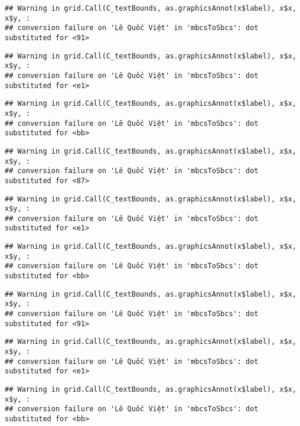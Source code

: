 \documentclass[
]{article}
\begin{document}
\begin{verbatim}
## Warning in grid.Call(C_textBounds, as.graphicsAnnot(x$label), x$x, x$y, :
## conversion failure on 'Lê Quốc Việt' in 'mbcsToSbcs': dot substituted for <91>
\end{verbatim}

\begin{verbatim}
## Warning in grid.Call(C_textBounds, as.graphicsAnnot(x$label), x$x, x$y, :
## conversion failure on 'Lê Quốc Việt' in 'mbcsToSbcs': dot substituted for <e1>
\end{verbatim}

\begin{verbatim}
## Warning in grid.Call(C_textBounds, as.graphicsAnnot(x$label), x$x, x$y, :
## conversion failure on 'Lê Quốc Việt' in 'mbcsToSbcs': dot substituted for <bb>
\end{verbatim}

\begin{verbatim}
## Warning in grid.Call(C_textBounds, as.graphicsAnnot(x$label), x$x, x$y, :
## conversion failure on 'Lê Quốc Việt' in 'mbcsToSbcs': dot substituted for <87>
\end{verbatim}

\begin{verbatim}
## Warning in grid.Call(C_textBounds, as.graphicsAnnot(x$label), x$x, x$y, :
## conversion failure on 'Lê Quốc Việt' in 'mbcsToSbcs': dot substituted for <e1>
\end{verbatim}

\begin{verbatim}
## Warning in grid.Call(C_textBounds, as.graphicsAnnot(x$label), x$x, x$y, :
## conversion failure on 'Lê Quốc Việt' in 'mbcsToSbcs': dot substituted for <bb>
\end{verbatim}

\begin{verbatim}
## Warning in grid.Call(C_textBounds, as.graphicsAnnot(x$label), x$x, x$y, :
## conversion failure on 'Lê Quốc Việt' in 'mbcsToSbcs': dot substituted for <91>
\end{verbatim}

\begin{verbatim}
## Warning in grid.Call(C_textBounds, as.graphicsAnnot(x$label), x$x, x$y, :
## conversion failure on 'Lê Quốc Việt' in 'mbcsToSbcs': dot substituted for <e1>
\end{verbatim}

\begin{verbatim}
## Warning in grid.Call(C_textBounds, as.graphicsAnnot(x$label), x$x, x$y, :
## conversion failure on 'Lê Quốc Việt' in 'mbcsToSbcs': dot substituted for <bb>
\end{verbatim}
\end{document}
